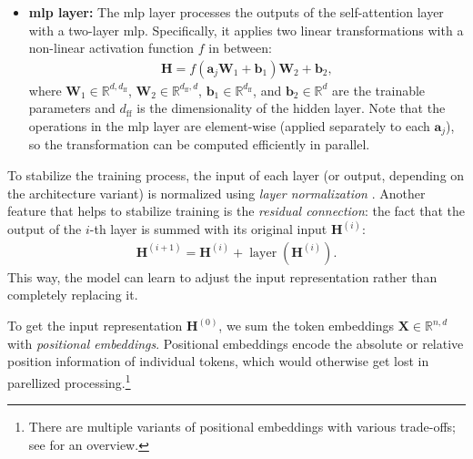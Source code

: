 {\begin{itemize}
\begin{align}
          \end{align}
          To capture different aspects of the input sequence, transformer uses multiple \emph{attention heads}. Each head $\mathcal{H}_k$ is parametrized by a set of attention matrices $\mathbf{W}^{(k)}_\mathbf{q}$,$\mathbf{W}^{(k)}_\mathbf{k}$, and $\mathbf{W}^{(k)}_\mathbf{v}$, computing the self-attention as described above. To compute the output of the self-attention layer, the output of each head is concatenated and linearly transformed using the trainable output matrix $\mathbf{W}_o$:
          \begin{align}
              \mathbf{A} = \operatorname{concat}(\operatorname{attn}_{\mathcal{H}_1}, \ldots, \operatorname{attn}_{\mathcal{H}_k})\mathbf{W}_o.
          \end{align}
    \item \textbf{\ac{mlp} layer:} The \ac{mlp} layer processes the outputs of the self-attention layer with a two-layer \ac{mlp}. Specifically, it applies two linear transformations with a non-linear activation function $f$ in between:
          \begin{align}
              \mathbf{H} = f(\mathbf{a}_j\mathbf{W}_1 + \mathbf{b}_1)\mathbf{W}_2 + \mathbf{b}_2,
          \end{align}
          where $\mathbf{W}_1 \in \mathbb{R}^{d,d_{\text{ff}}}$, $\mathbf{W}_2 \in \mathbb{R}^{d_{\text{ff}},d}$, $\mathbf{b}_1 \in \mathbb{R}^{d_{\text{ff}}}$, and $\mathbf{b}_2 \in \mathbb{R}^{d}$ are the trainable parameters and $d_{\text{ff}}$ is the dimensionality of the hidden layer. Note that the operations in the \ac{mlp} layer are element-wise (applied separately to each $\mathbf{a}_j$), so the transformation can be computed efficiently in parallel.
\end{itemize}
To stabilize the training process, the input of each layer (or output, depending on the architecture variant) is normalized using \emph{layer normalization} \cite{ba2016layer}. Another feature that helps to stabilize training is the \emph{residual connection}: the fact that the output of the $i$-th layer is summed with its original input $\mathbf{H}^{(i)}$:
\begin{align}
    \mathbf{H}^{(i+1)} = \mathbf{H}^{(i)} + \operatorname{layer}(\mathbf{H}^{(i)}).
\end{align}
This way, the model can learn to adjust the input representation rather than completely replacing it.

To get the input representation $\mathbf{H}^{(0)}$, we sum the token embeddings $\mathbf{X} \in \mathbb{R}^{n,d}$ with \emph{positional embeddings}. Positional embeddings encode the absolute or relative position information of individual tokens, which would otherwise get lost in parellized processing.\footnote{There are multiple variants of positional embeddings with various trade-offs; see \citet{dufter2022position} for an overview.}



}
